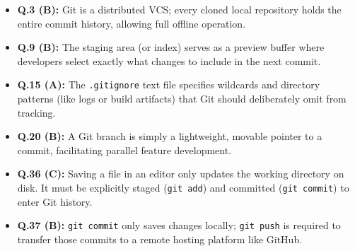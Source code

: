 \begin{expbox}
\begin{itemize}[leftmargin=5mm]
    \item \textbf{Q.3 (B):} Git is a distributed VCS; every cloned local repository holds the entire commit history, allowing full offline operation.
    \item \textbf{Q.9 (B):} The staging area (or index) serves as a preview buffer where developers select exactly what changes to include in the next commit.
    \item \textbf{Q.15 (A):} The \texttt{.gitignore} text file specifies wildcards and directory patterns (like logs or build artifacts) that Git should deliberately omit from tracking.
    \item \textbf{Q.20 (B):} A Git branch is simply a lightweight, movable pointer to a commit, facilitating parallel feature development.
    \item \textbf{Q.36 (C):} Saving a file in an editor only updates the working directory on disk. It must be explicitly staged (\texttt{git add}) and committed (\texttt{git commit}) to enter Git history.
    \item \textbf{Q.37 (B):} \texttt{git commit} only saves changes locally; \texttt{git push} is required to transfer those commits to a remote hosting platform like GitHub.
\end{itemize}
\end{expbox}

\newpage
